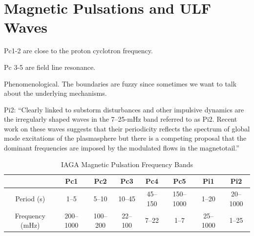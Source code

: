 
\chapter{Magnetic Pulsations and ULF Waves}
  \label{ch_pc4s}



Pc1-2 are close to the proton cyclotron frequency. 

Pc 3-5 are field line resonance. 

Phenomenological. The boundaries are fuzzy since sometimes we want to talk about the underlying mechanisms. 

Pi2: ``Clearly linked to substorm disturbances and other impulsive dynamics are the irregularly shaped waves in the 7--25-mHz band referred to as Pi2. Recent work on these waves suggests that their periodicity reflects the spectrum of global mode excitations of the plasmasphere but there is a competing proposal that the dominant frequencies are imposed by the modulated flows in the magnetotail.''\cite{kivelson_2006}




\begin{longtable}{ @{\extracolsep{\fill}} cccccccc @{\extracolsep{\fill}} }
  \caption[IAGA Magnetic Pulsation Frequency Bands]{IAGA Magnetic Pulsation Frequency Bands\cite{jacobs_1964}}
  \label{tab_iaga} \\

  \toprule
  &
  Pc1 &
  Pc2 &
  Pc3 &
  Pc4 &
  Pc5 &
  Pi1 &
  Pi2 \\
  \midrule
  \endfirsthead

  \bottomrule
  \endlastfoot

  Period (\si{\second}) &
  1--5 &
  5--10 &
  10--45 &
  45--150 &
  150--1000 &
  1--20 &
  20--1000 \\

  Frequency (\si{\mHz})&
  200--1000 &
  100--200 &
  22--100 &
  7--22 &
  1--7 &
  25--1000 &
  1--25 \\

\end{longtable}




